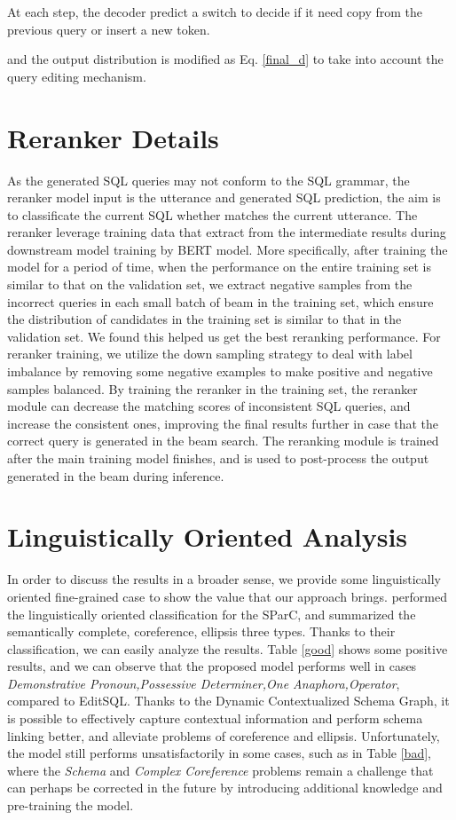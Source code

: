 \documentclass[letterpaper]{article} \usepackage{aaai21}  \usepackage{times}  \usepackage{helvet} \usepackage{courier}  \usepackage[hyphens]{url}  \usepackage{graphicx} \urlstyle{rm} \def\UrlFont{\rm}  \usepackage{natbib}  \usepackage{caption} \frenchspacing  \setlength{\pdfpagewidth}{8.5in}  \setlength{\pdfpageheight}{11in}
\begin{document}
At each step, the decoder predict a switch  to decide if it need copy from the previous query or insert a new token.

and the output distribution is modified as Eq. \ref{final_d} to take into account the query editing mechanism.




\section{Reranker Details}
As the generated SQL queries may not conform to the SQL grammar, the reranker model input is the utterance and generated SQL prediction, the aim is to classificate the current SQL whether matches the current utterance. 
The reranker leverage training data that extract from the intermediate results during downstream model training by BERT model.
More specifically, after training the model for a period of time, when the performance on the entire training set is similar to that on the validation set, we extract negative samples from the incorrect queries in each small batch of beam in the training set, which ensure the distribution of candidates in the training set is similar to that in the validation set. We found this helped us get the best reranking performance. 
For reranker training, we utilize the down sampling strategy to deal with label imbalance by removing some negative examples to make positive and negative samples balanced.
By training the reranker in the training set, the reranker module can decrease the matching scores of inconsistent SQL queries, and increase the consistent ones, improving the final results further in case that the correct query is generated in the beam search.
The reranking module is trained after the main training model finishes, and is used to post-process the output generated in the beam during inference.


\section{Linguistically Oriented Analysis}
In order to discuss the results in a broader sense, we provide some linguistically oriented fine-grained case to show the value that our approach brings.
\citet{DBLP:conf/ijcai/LiuCGLZZ20} performed the linguistically oriented classification for the SParC, and summarized the semantically complete, coreference, ellipsis three types.
Thanks to their classification, we can easily analyze the results.
Table \ref{good} shows some positive results, and we can observe that the proposed model performs well in cases \textit{Demonstrative Pronoun,Possessive Determiner,One Anaphora,Operator}, compared to EditSQL.
Thanks to the Dynamic Contextualized Schema Graph, it is possible to effectively capture contextual information and perform schema linking better, and alleviate problems of coreference and ellipsis.
Unfortunately, the model still performs unsatisfactorily in some cases, such as in Table \ref{bad}, where the \textit{Schema} and \textit{Complex Coreference} problems remain a challenge that can perhaps be corrected in the future by introducing additional knowledge and pre-training the model.
\end{document}
